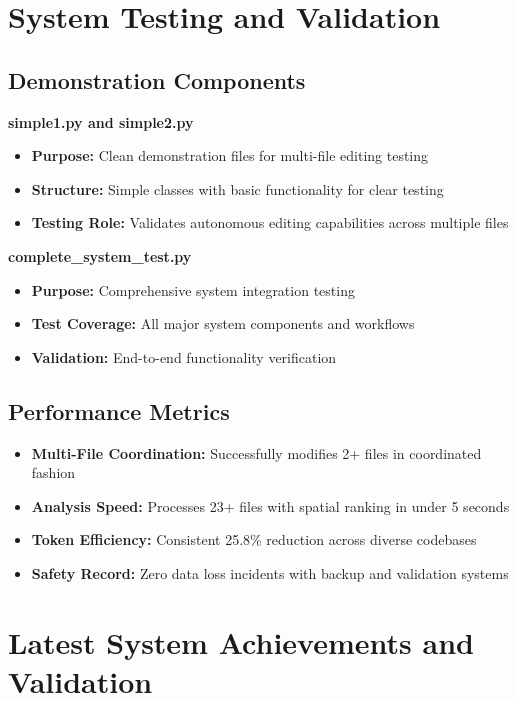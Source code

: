 \documentclass[12pt,a4paper]{article}
\begin{document}
\section{System Testing and Validation}

\subsection{Demonstration Components}

\textbf{simple1.py and simple2.py}
\begin{itemize}
    \item \textbf{Purpose:} Clean demonstration files for multi-file editing testing
    \item \textbf{Structure:} Simple classes with basic functionality for clear testing
    \item \textbf{Testing Role:} Validates autonomous editing capabilities across multiple files
\end{itemize}

\textbf{complete\_system\_test.py}
\begin{itemize}
    \item \textbf{Purpose:} Comprehensive system integration testing
    \item \textbf{Test Coverage:} All major system components and workflows
    \item \textbf{Validation:} End-to-end functionality verification
\end{itemize}

\subsection{Performance Metrics}

\begin{itemize}
    \item \textbf{Multi-File Coordination:} Successfully modifies 2+ files in coordinated fashion
    \item \textbf{Analysis Speed:} Processes 23+ files with spatial ranking in under 5 seconds
    \item \textbf{Token Efficiency:} Consistent 25.8\% reduction across diverse codebases
    \item \textbf{Safety Record:} Zero data loss incidents with backup and validation systems
\end{itemize}

\section{Latest System Achievements and Validation}
\end{document}
